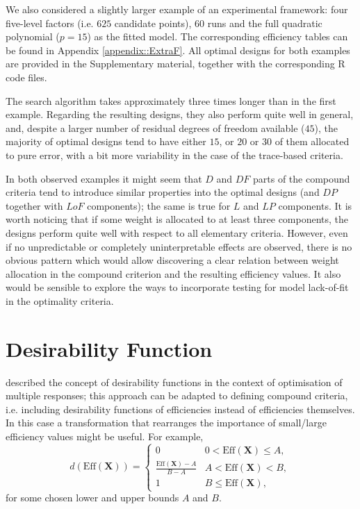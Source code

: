 We also considered a slightly larger example of an experimental framework: four five-level factors (i.e. $625$ candidate points), $60$ runs and the full quadratic polynomial ($p=15$) as the fitted model. The corresponding efficiency tables can be found in Appendix \ref{appendix::ExtraF}. All optimal designs for both examples are provided in the Supplementary material, together with the corresponding R code files.

The search algorithm takes approximately three times longer than in the first example. Regarding the resulting designs, they also perform quite well in general, and, despite a larger number of residual degrees of freedom available ($45$), the majority of optimal designs tend to have either $15$, or $20$ or $30$ of them allocated to pure error, with a bit more variability in the case of the trace-based criteria. 

In both observed examples it might seem that $D$ and $DF$ parts of the compound criteria tend to introduce similar properties into the optimal designs (and $DP$ together with $LoF$ components); the same is true for $L$ and $LP$ components. It is worth noticing that if some weight is allocated to at least three components, the designs perform quite well with respect to all elementary criteria. However, even if no unpredictable or completely uninterpretable effects are observed, there is no obvious pattern which would allow discovering a clear relation between weight allocation in the compound criterion and the resulting efficiency values. It also would be sensible to explore the ways to incorporate testing for model lack-of-fit in the optimality criteria. 
 
\section{Desirability Function}
\label{sec::desfun}
\citet{Myers2009} described the concept of desirability functions in the context of optimisation of multiple responses; this approach can be adapted to defining compound criteria, i.e. including desirability functions of efficiencies  instead of efficiencies themselves. In this case a transformation that rearranges the importance of small/large efficiency values might be useful. For example, 
\begin{equation}
\label{eq::des_fun_trivial}
d(\mbox{Eff}(\bm{X}))=\begin{cases}0 & 0<\mbox{Eff}(\bm{X})\leq A, \\
\frac{\mbox{Eff}(\bm{X})-A}{B-A} & A<\mbox{Eff}(\bm{X})<B, \\
1 & B\leq \mbox{Eff}(\bm{X}),
\end{cases}
\end{equation}
for some chosen lower and upper bounds $A$ and $B$.

